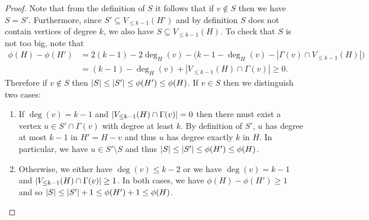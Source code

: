 \documentclass[11pt]{article}
\numberwithin{theorem}{section}
\DeclarePairedDelimiter\abs{\lvert}{\rvert}
\begin{document}
\begin{proof}
  Note that from the definition of $S$ it follows that if $v \notin S$ then we
  have $S = S'$. Furthermore,  since $S'\subseteq V_{\leq k-1}(H')$ and by
  definition $S$ does not contain vertices of degree $k$, we also have $S
  \subseteq
  V_{\leq k-1}(H)$. 
  To check that $S$ is not too big, note that 
  \begin{align*}
  \phi(H)-\phi(H') & = 2 (k - 1) - 2 \deg_H(v) -
   \big( k - 1 - \deg_H(v)  - |\Gamma(v) \cap V_{\le k - 1}(H)| \big)   \\ 
   & = (k - 1) - \deg_H(v) +| V_{\le k - 1}(H) \cap \Gamma(v)|  \ge 0.
  \end{align*}
  Therefore if $v\notin S$ then $\abs{S}\leq \abs{S'}\leq \phi(H')\leq
  \phi(H)$. If $v\in S$ then we distinguish two cases:
  \begin{enumerate}
    \item If $\deg(v)=k-1$ and $\abs {V_{\leq k-1}(H)\cap \Gamma(v)} =0$ then
      there must exist a vertex $u\in S' \cap \Gamma(v)$ with degree at least
      $k$. By definition of $S'$, $u$ has degree at most $k-1$ in $H'=H-v$ and
      thus $u$ has degree exactly $k$ in $H$. In particular, we have $u\in
      S'\setminus S$ and thus $\abs{S} \leq \abs{S'} \leq \phi(H')\leq
      \phi(H)$.
    \item Otherwise, we either have
      $\deg(v)\leq k-2$ or we have $\deg(v)=k-1$ and $\abs {V_{\leq
      k-1}(H)\cap \Gamma(v)} \geq 1$. In both cases, we have
      $\phi(H)-\phi(H')\geq 1$ and so $\abs{S}\leq \abs{S'}+1 \leq \phi(H')+1
      \leq \phi(H)$.
  \end{enumerate}


\end{proof}
\end{document}
